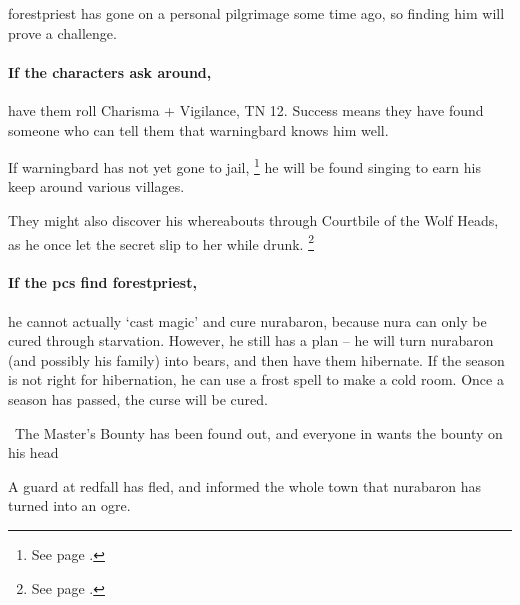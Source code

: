 \Gls{forestpriest} has gone on a personal pilgrimage some time ago, so finding him will prove a challenge.

\paragraph{If the characters ask around,}
have them roll Charisma + Vigilance, TN 12.
Success means they have found someone who can tell them that \gls{warningbard} knows him well.

If \gls{warningbard} has not yet gone to jail,%
\footnote{See page \pageref{warningbard}.}
he will be found singing to earn his keep around various \glspl{village}.

They might also discover his whereabouts through Courtbile of the Wolf Heads, as he once let the secret slip to her while drunk.%
\footnote{See page \pageref{courtbile}.}

\paragraph{If the \glspl{pc} find \gls{forestpriest},}
he cannot actually `cast magic' and cure \gls{nurabaron}, because nura can only be cured through starvation.
However, he still has a plan -- he will turn \gls{nurabaron} (and possibly his family) into bears, and then have them hibernate.
If the season is not right for hibernation, he can use a frost spell to make a cold room.
Once a season has passed, the curse will be cured.


{\N \N\ The Master's Bounty}%
{ has been found out, and everyone in  wants the bounty on his head}%
\label{mastersBounty}

A guard at \gls{redfall} has fled, and informed the whole town that \gls{nurabaron} has turned into an ogre.

